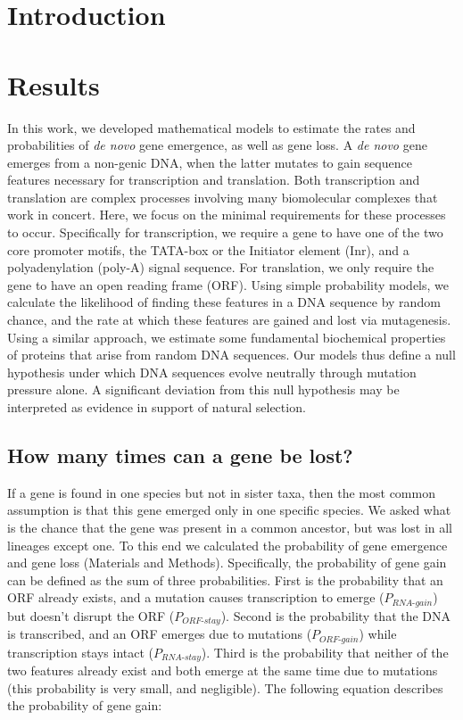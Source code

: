 \documentclass[12pt,a4paper]{article}
\begin{document}
\onehalfspacing

\section{Introduction}

\section{Results}

In this work, we developed mathematical models to estimate the rates and probabilities of \textit{de novo} gene emergence, as well as gene loss. A \textit{de novo} gene emerges from a non-genic DNA, when the latter mutates to gain sequence features necessary for transcription and translation. Both transcription and translation are complex processes involving many biomolecular complexes that work in concert. Here, we focus on the minimal requirements for these processes to occur. Specifically for transcription, we require a gene to have one of the two core promoter motifs, the TATA-box or the Initiator element (Inr), and a polyadenylation (poly-A) signal sequence. For translation, we only require the gene to have an open reading frame (ORF). Using simple probability models, we calculate the likelihood of finding these features in a DNA sequence by random chance, and the rate at which these features are gained and lost via mutagenesis. Using a similar approach, we estimate some fundamental biochemical properties of proteins that arise from random DNA sequences. Our models thus define a null hypothesis under which DNA sequences evolve neutrally through mutation pressure alone. A significant deviation from this null hypothesis may be interpreted as evidence in support of natural selection. 

\subsection{How many times can a gene be lost?}

If a gene is found in one species but not in sister taxa, then the most common assumption is that this gene emerged only in one specific species. We asked what is the chance that the gene was present in a common ancestor, but was lost in all lineages except one. To this end we calculated the probability of gene emergence and gene loss (Materials and Methods). Specifically, the probability of gene gain can be defined as the sum of three probabilities. First is the probability that an ORF already exists, and a mutation causes transcription to emerge ($P_\textit{RNA-gain}$) but doesn't disrupt the ORF ($P_\textit{ORF-stay}$). Second is the probability that the DNA is transcribed, and an ORF emerges due to mutations ($P_\textit{ORF-gain}$) while transcription stays intact ($P_\textit{RNA-stay}$). Third is the probability that neither of the two features already exist and both emerge at the same time due to mutations (this probability is very small, and negligible). The following equation describes the probability of gene gain:
\end{document}

